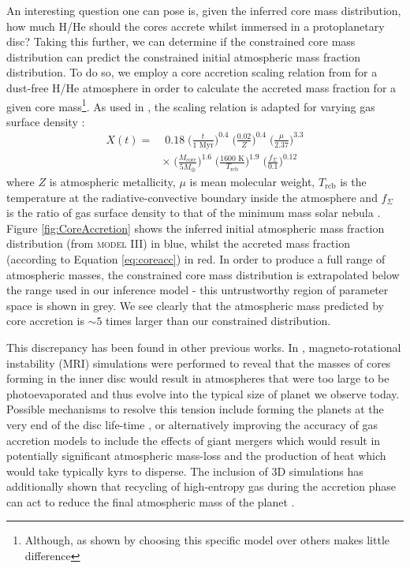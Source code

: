 \documentclass[fleqn,usenatbib]{mnras}
\begin{document}
An interesting question one can pose is, given the inferred core mass distribution, how much H/He should the cores accrete whilst immersed in a protoplanetary disc? Taking this further, we can determine if the constrained core mass distribution can predict the constrained initial atmospheric mass fraction distribution. To do so, we employ a core accretion scaling relation from \cite{LeeChiang2015} for a dust-free H/He atmosphere in order to calculate the accreted mass fraction for a given core mass\footnote{Although, as shown by \citet{Jankovic2018} choosing this specific model over others makes little difference}. As used in \cite{Jankovic2018}, the scaling relation is adapted for varying gas surface density \citep{Lee2018,FungLee2018}:
\begin{equation} \label{eq:coreacc}
    \begin{split}
    X(t) = & \; 0.18 \; \bigg( \frac{t}{1\text{ Myr}} \bigg)^{0.4} \; \bigg( \frac{0.02}{Z} \bigg)^{0.4}
    \; \bigg( \frac{\mu}{2.37} \bigg)^{3.3} \\
    & \times \; \bigg( \frac{M_\text{core}}{5M_\oplus} \bigg)^{1.6} \; \bigg( \frac{1600\text{ K}}{T_\text{rcb}} \bigg)^{1.9} \; \bigg( \frac{f_\Sigma}{0.1} \bigg)^{0.12}
    \end{split}
\end{equation}{}
where $Z$ is atmospheric metallicity, $\mu$ is mean molecular weight, $T_\text{rcb}$ is the temperature at the radiative-convective boundary inside the atmosphere and $f_\Sigma$ is the ratio of gas surface density to that of the minimum mass solar nebula \citep{Hayashi1981}. Figure \ref{fig:CoreAccretion} shows the inferred initial atmospheric mass fraction distribution (from \textsc{model III}) in blue, whilst the accreted mass fraction (according to Equation \ref{eq:coreacc}) in red. In order to produce a full range of atmospheric masses, the constrained core mass distribution is extrapolated below the range used in our inference model - this untrustworthy region of parameter space is shown in grey. We see clearly that the atmospheric mass predicted by core accretion is $\sim5$ times larger than our constrained distribution.


This discrepancy has been found in other previous works. In \cite{Jankovic2018}, magneto-rotational instability (MRI) simulations were performed to reveal that the masses of cores forming in the inner disc would result in atmospheres that were too large to be photoevaporated and thus evolve into the typical size of planet we observe today. Possible mechanisms to resolve this tension include forming the planets at the very end of the disc life-time \citep{Ikomi2012,LeeChiang2016}, or alternatively improving the accuracy of gas accretion models to include the effects of giant mergers \cite{Liu2015,Inamdar2016} which would result in potentially significant atmospheric mass-loss and the production of heat which would take typically kyrs to disperse. The inclusion of 3D simulations has additionally shown that recycling of high-entropy gas during the accretion phase can act to reduce the final atmospheric mass of the planet \citep{Ormel2015,Fung2015,Cimerman2017,AliDib2020,Chen2020}.
\end{document}
